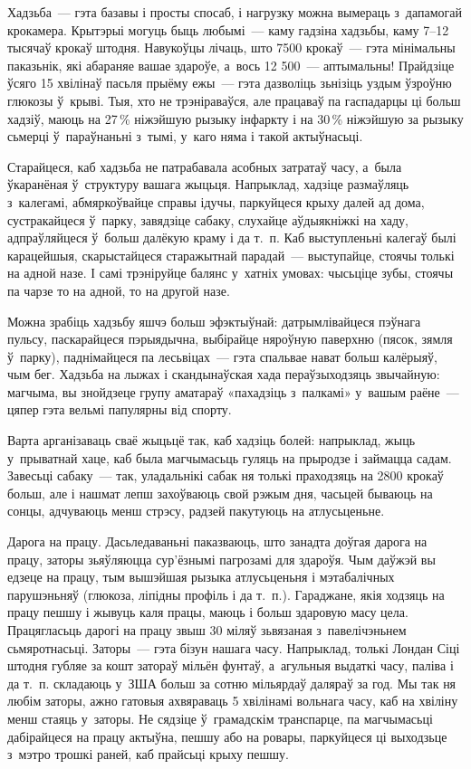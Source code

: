 Хадзьба~--- гэта базавы і просты спосаб, і нагрузку можна вымераць з~дапамогай крокамера. Крытэрыі могуць быць любымі~--- каму гадзіна хадзьбы, каму 7--12 тысячаў крокаў штодня. Навукоўцы лічаць, што 7500 крокаў~--- гэта мінімальны паказьнік, які абараняе вашае здароўе, а~вось 12 500~--- аптымальны! Прайдзіце ўсяго 15 хвілінаў пасьля прыёму ежы~--- гэта дазволіць зьнізіць уздым ўзроўню глюкозы ў~крыві. Тыя, хто не трэніраваўся, але працаваў па гаспадарцы ці больш хадзіў, маюць на 27\,\% ніжэйшую рызыку інфаркту і на 30\,\% ніжэйшую за рызыку сьмерці ў~параўнаньні з~тымі, у~каго няма і такой актыўнасьці.

Старайцеся, каб хадзьба не патрабавала асобных затратаў часу, а~была ўкаранёная ў~структуру вашага жыцьця. Напрыклад, хадзіце размаўляць з~калегамі, абмяркоўвайце справы ідучы, паркуйцеся крыху далей ад дома, сустракайцеся ў~парку, завядзіце сабаку, слухайце аўдыякніжкі на хаду, адпраўляйцеся ў~больш далёкую краму і да т.~п. Каб выступленьні калегаў былі карацейшыя, скарыстайцеся старажытнай парадай~--- выступайце, стоячы толькі на адной назе. І самі трэніруйце балянс у~хатніх умовах: чысьціце зубы, стоячы па чарзе то на адной, то на другой назе.

Можна зрабіць хадзьбу яшчэ больш эфэктыўнай: датрымлівайцеся пэўнага пульсу, паскарайцеся пэрыядычна, выбірайце няроўную паверхню (пясок, зямля ў~парку), паднімайцеся па лесьвіцах~--- гэта спальвае нават больш калёрыяў, чым бег. Хадзьба на лыжах і скандынаўская хада пераўзыходзяць звычайную: магчыма, вы знойдзеце групу аматараў «пахадзіць з~палкамі» у~вашым раёне~--- цяпер гэта вельмі папулярны від спорту.

Варта арганізаваць сваё жыцьцё так, каб хадзіць болей: напрыклад, жыць у~прыватнай хаце, каб была магчымасьць гуляць на прыродзе і займацца садам. Завесьці сабаку~--- так, уладальнікі сабак ня толькі праходзяць на 2800 крокаў больш, але і нашмат лепш захоўваюць свой рэжым дня, часьцей бываюць на сонцы, адчуваюць менш стрэсу, радзей пакутуюць на атлусьценьне.

Дарога на працу. Дасьледаваньні паказваюць, што занадта доўгая дарога на працу, заторы зьяўляюцца сур'ёзнымі пагрозамі для здароўя. Чым даўжэй вы едзеце на працу, тым вышэйшая рызыка атлусьценьня і мэтабалічных парушэньняў (глюкоза, ліпідны профіль і да т.~п.). Гараджане, якія ходзяць на працу пешшу і жывуць каля працы, маюць і больш здаровую масу цела. Працягласьць дарогі на працу звыш 30 міляў зьвязаная з~павелічэньнем сьмяротнасьці. Заторы~--- гэта бізун нашага часу. Напрыклад, толькі Лондан Сіці штодня губляе за кошт затораў мільён фунтаў, а~агульныя выдаткі часу, паліва і да т.~п. складаюць у~ЗША больш за сотню мільярдаў даляраў за год. Мы так ня любім заторы, ажно гатовыя ахвяраваць 5 хвілінамі вольнага часу, каб на хвіліну менш стаяць у~заторы. Не сядзіце ў~грамадскім транспарце, па магчымасьці дабірайцеся на працу актыўна, пешшу або на ровары, паркуйцеся ці выходзьце з~мэтро трошкі раней, каб прайсьці крыху пешшу.

